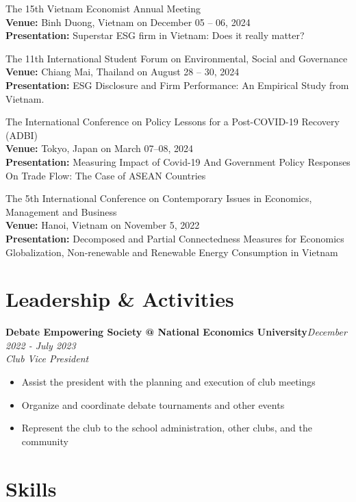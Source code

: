 \documentclass[10.5pt]{article}
\begin{document}
\begin{enumerate}[label={[\arabic*]}]
\item The 15th Vietnam Economist Annual Meeting \\
	\textbf{Venue:} Binh Duong, Vietnam on December 05 -- 06, 2024 \\
	\textbf{Presentation:} Superstar ESG firm in Vietnam: Does it really matter?
\item The 11th International Student Forum on Environmental, Social and Governance \\
	\textbf{Venue:} Chiang Mai, Thailand on August 28 -- 30, 2024 \\
	\textbf{Presentation:} ESG Disclosure and Firm Performance: An Empirical Study from Vietnam.
\item The International Conference on Policy Lessons for a Post-COVID-19 Recovery (ADBI) \\
	\textbf{Venue:} Tokyo, Japan on March 07--08, 2024 \\
	\textbf{Presentation:} Measuring Impact of Covid-19 And Government Policy Responses On Trade Flow: The Case of ASEAN Countries
\item The 5th International Conference on Contemporary Issues in Economics, Management and Business \\
	\textbf{Venue:} Hanoi, Vietnam on November 5, 2022 \\
	\textbf{Presentation:} Decomposed and Partial Connectedness Measures for Economics Globalization, Non-renewable and Renewable Energy Consumption in Vietnam
\end{enumerate}

\section{Leadership \& Activities}
\textbf{Debate Empowering Society @ National Economics University}\hfill \emph{December 2022 - July 2023}\\
\textit{Club Vice President}
\begin{itemize}
    \item Assist the president with the planning and execution of club meetings
    \item Organize and coordinate debate tournaments and other events
    \item Represent the club to the school administration, other clubs, and the community
\end{itemize}

\section{Skills}
\end{document}
